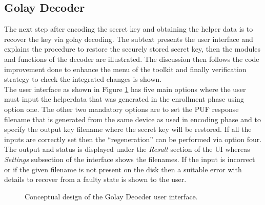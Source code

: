 	\subsection{Golay Decoder}
	The next step after encoding the secret key and obtaining the helper data is to recover the key via golay decoding. The subtext presents the user interface and explains the procedure to restore the securely stored secret key, then the modules and functions of the decoder are illustrated. The discussion then follows the code improvement done to enhance the menu of the toolkit and finally verification strategy to check the integrated changes is shown.\\

	The user interface as shown in Figure \ref{img:golay_decoder_ui} has five main options where the user must input the helperdata that was generated in the enrollment phase using option one. The other two mandatory options are to set the PUF response filename that is generated from the same device as used in encoding phase and to specify the output key filename where the secret key will be restored. If all the inputs are correctly set then the ``regeneration'' can be performed via option four. The output and status is displayed
	under the \emph{Result} section of the UI whereas \emph{Settings} subsection of the interface shows the filenames. If the input is incorrect or if the given filename is not present on the disk then a suitable error with details to recover from a faulty state is shown to the user.\\
	\begin{figure}
	\centering
	\caption{Conceptual design of the Golay Deocder user interface.}
	\label{img:golay_decoder_ui}
	\end{figure}

